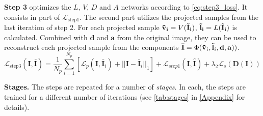 \textbf{Step 3} optimizes the $L$, $V$, $D$ and $A$ networks according to \autoref{eq:step3_loss}. It consists in part of $\mathcal{L}_{\textrm{step1}}$. The second part utilizes the projected samples from the last iteration of step 2. For each projected sample $\mathbf{\Tilde{v}_i}=V(\mathbf{\Tilde{I}_i})$, $\mathbf{\Tilde{l}_i}=L(\mathbf{\Tilde{I}_i})$ is calculated. Combined with $\mathbf{d}$ and  $\mathbf{a}$ from the original image, they can be used to reconstruct each projected sample from the components  $\mathbf{\bar{I}} = \Phi(\mathbf{\Tilde{v}}_i, \mathbf{\Tilde{l}}_i,  \mathbf{d}, \mathbf{a}))$.
\begin{equation}
    \mathcal{L}_{\textrm{step3}}(\mathbf{I}, \bar{\mathbf{I}})
    = \frac{1}{N_p} \sum_{i=1}^{N_p} [\mathcal{L}_p (\mathbf{I}, \mathbf{\bar{I}}_i ) + ||\mathbf{I} - \mathbf{\bar{I}}_i ||_1]  + \mathcal{L}_{step1}(\mathbf{I}, \mathbf{\hat{I}}) + \lambda_2 \mathcal{L}_{s}(\mathbf{D(\mathbf{I})})
    \label{eq:step3_loss}
\end{equation}

\textbf{Stages.} The steps are repeated for a number of \textit{stages}. In each, the steps are trained for a different number of iterations (see \autoref{tab:stages} in \autoref{Appendix} for details).

